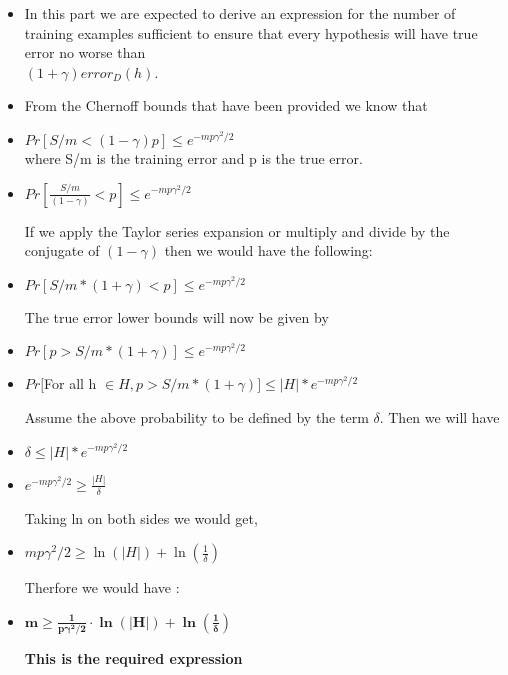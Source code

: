 \documentclass[12pt, fullpage,letterpaper]{article}
\begin{document}
\begin{itemize}
	\item[] In this part we are expected to derive an expression for the number of training examples sufficient to ensure that every hypothesis will have true error no worse than \\ $(1+\gamma)error_D(h)$.
	
	\item [] From the Chernoff bounds that have been provided we know that 
	
	\item [] $Pr[S/m < (1 - \gamma) p ] \leq e^{{-mp\gamma^2}/2}$\\
	where S/m is the training error and p is the true error.
	
	\item[] $Pr[\frac{S/m}{(1 - \gamma)} <  p ] \leq  e^{{-mp\gamma^2}/2}$
	
	If we apply the Taylor series expansion or multiply and divide by the conjugate of $(1 - \gamma)$ then we would have the following:
	
	\item [] $Pr[{S/m}  * (1+ \gamma)<  p ] \leq  e^{{-mp\gamma^2}/2}$
	
	The true error lower bounds will now be given by 
	\item[] $Pr[p > {S/m}  * (1+ \gamma) ] \leq  e^{{-mp\gamma^2}/2}$
	
	\item []$Pr[$For all h $\in H,  p > {S/m}  * (1+ \gamma)] \leq |H| * e^{{-mp\gamma^2}/2}$
	
	Assume the above probability to be defined by the term $\delta$. Then we will have 
	
	\item[] $\delta \leq |H| * e^{{-mp\gamma^2}/2}$ 
	
	\item[] $e^{{-mp\gamma^2}/2} \geq \frac{|H|}{\delta}$ 
	
	Taking ln on both sides we would get,
	
	\item[] $mp\gamma^2/2 \geq  \ln(|H|) + \ln(\frac{1}{\delta})$
	
	Therfore we would have :
	
	\item[] $\mathbf{m \geq \frac{1}{p\gamma^2/2} \cdot \ln(|H|) + \ln(\frac{1}{\delta})}$
	
	\textbf{ This is the required expression}
	
	\end{itemize}
\end{document}
